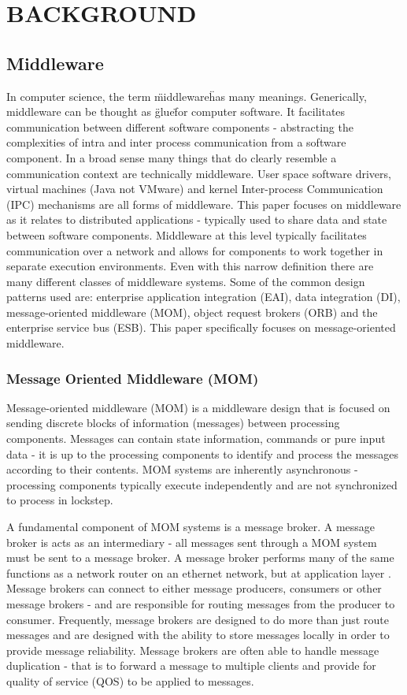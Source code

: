 \documentclass{thesis}
\begin{document}

\chapter{BACKGROUND}

\section{Middleware}
In computer science, the term \"middleware\" has many meanings.  Generically, middleware can be thought as \"glue\"  for computer software.  It facilitates communication between different software components - abstracting the complexities of intra and inter process communication from a software component.  In a broad sense many things that do clearly resemble a communication context are technically middleware.  User space software drivers, virtual machines (Java not VMware) and kernel Inter-process Communication (IPC) mechanisms are all forms of middleware.  This paper focuses on middleware as it relates to distributed applications - typically used to share data and state between software components.  Middleware at this level typically facilitates communication over a network and allows for components to work together in separate execution environments.  Even with this narrow definition there are many different classes of middleware systems.  Some of the common design patterns used are: enterprise application integration (EAI), data integration (DI), message-oriented middleware (MOM), object request brokers (ORB) and the enterprise service bus (ESB).  This paper specifically focuses on message-oriented middleware. 

\subsection{Message Oriented Middleware (MOM)}
Message-oriented middleware (MOM) is a middleware design that is focused on sending discrete blocks of information (messages) between processing components.  Messages can contain state information, commands or pure input data - it is up to the processing components to identify and process the messages according to their contents.  MOM systems are inherently asynchronous - processing components typically execute independently and are not synchronized to process in lockstep.

A fundamental component of MOM systems is a message broker.  A message broker is acts as an intermediary - all messages sent through a MOM system must be sent to a message broker.  A message broker performs many of the same functions as a network router on an ethernet network, but at application layer \cite{WIKI_OSI}.  Message brokers can connect to either message producers, consumers or other message brokers - and are responsible for routing messages from the producer to consumer.  Frequently, message brokers are designed to do more than just route messages and are designed with the ability to store messages locally in order to provide message reliability.  Message brokers are often able to handle message duplication - that is to forward a message to multiple clients and provide for quality of service (QOS) to be applied to messages.  
\end{document}
